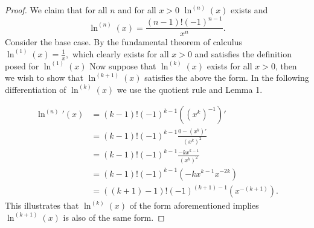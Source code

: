 \documentclass[letter]{article}
\newenvironment{menumerate}{%
  \edef\backupindent{\the\parindent}%
  \enumerate%
  \setlength{\parindent}{\backupindent}%
}{\endenumerate}
\begin{document}
\begin{menumerate}
\begin{menumerate}
\begin{proof}
	 	We claim that for all $n$ and for all $x > 0$ $\ln^{(n)}(x)$ exists and $$\ln^{(n)}(x) = \frac{(n-1)!(-1)^{n-1}}{x^n}.$$ Consider the base case. By the fundamental theorem of calculus $\ln^{(1)}(x) = \frac{1}{x},$ which clearly exists for all $x > 0$ and satisfies the definition posed for $\ln^{(1)}(x)$ Now suppose that $\ln^{(k)}(x)$ exists for all $x>0$, then we wish to show that $\ln^{(k+1)}(x)$ satisfies the above the form. In the following differentiation of $\ln^{(k)}(x)$ we use the quotient rule and Lemma 1.

	 	\begin{equation*}
	 	\begin{aligned}
	 	\ln^{(n)}'(x) &= (k-1)!(-1)^{k-1}\left(\left(x^k\right)^{-1}\right)' \\
	 	&= (k-1)!(-1)^{k-1}\frac{0-(x^k)'}{(x^k)^2} \\
	 	&= (k-1)!(-1)^{k-1}\frac{-kx^{k-1}}{(x^k)^2} \\
	 	&= (k-1)!(-1)^{k-1}\left(-kx^{k-1}x^{-2k}\right) \\
	 	&= ((k+1)-1)!(-1)^{(k+1)-1}\left(x^{-{(k+1)}}\right).
	 	\end{aligned}
	 	\end{equation*}
	 	This illustrates that $\ln^{(k)}(x)$ of the form aforementioned implies $\ln^{(k+1)}(x)$ is also of the same form. 


\end{proof}
\end{menumerate}
\end{menumerate}
\end{document}
